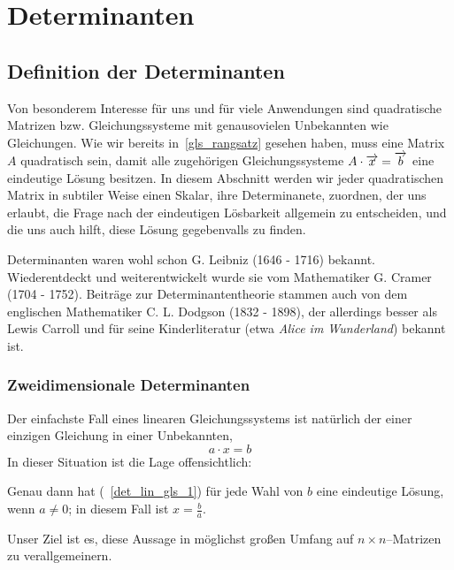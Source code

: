 
\chapter{Determinanten}

\section{Definition der Determinanten}

Von besonderem Interesse für uns und für viele Anwendungen sind quadratische Matrizen bzw. Gleichungssysteme 
mit genausovielen Unbekannten wie Gleichungen. Wie wir bereits in~\ref{gls_rangsatz} gesehen haben, muss eine 
Matrix $A$ quadratisch sein, damit alle zugehörigen Gleichungssysteme $A \cdot \overrightarrow{x} = 
\overrightarrow{b}$ eine eindeutige Lösung besitzen. In diesem Abschnitt werden wir jeder quadratischen 
Matrix in subtiler Weise einen Skalar, ihre Determinanete, zuordnen, der uns erlaubt, die Frage nach der 
eindeutigen Lösbarkeit allgemein zu entscheiden, und die uns auch hilft, diese Lösung gegebenvalls zu 
finden.

Determinanten waren wohl schon G. Leibniz (1646 - 1716) bekannt. Wiederentdeckt und weiterentwickelt wurde 
sie vom Mathematiker G. Cramer (1704 - 1752). Beiträge zur Determinantentheorie stammen auch von 
dem englischen Mathematiker C. L. Dodgson (1832 - 1898), der allerdings besser als Lewis Carroll und für 
seine Kinderliteratur (etwa \textit{Alice im Wunderland}) bekannt ist.


\subsection{Zweidimensionale Determinanten}\label{section_det_2}

\setcounter{definition}{0}
\setcounter{beispiel}{0}
\setcounter{notiz}{0}


Der einfachste Fall eines linearen Gleichungssystems ist natürlich der einer einzigen Gleichung in einer 
Unbekannten, 
  \begin{equation}\label{det_lin_gls_1} a \cdot x = b \end{equation}
In dieser Situation ist die Lage offensichtlich: 

\begin{regel}
Genau dann hat (~\ref{det_lin_gls_1}) für jede Wahl von $b$ eine eindeutige Lösung, wenn $a \neq 0$; 
in diesem Fall ist $x = \frac {b}{a}$.
\end{regel}

Unser Ziel ist es, diese Aussage in möglichst großen Umfang auf $n \times n$--Matrizen zu verallgemeinern. 


